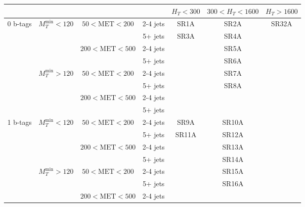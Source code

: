\documentclass[plain,landscape]{article}
\begin{document}
\begin{table}
\renewcommand{\arraystretch}{1.3}
\centering
\begin{tabular}{|c|c|c|c|c|c|c|c|}
\hline
& & \multicolumn{2}{|c|}{ } & $H_T < 300$ & \multicolumn{2}{|c|}{$300 < H_T < 1600$} & $H_T > 1600$  \\
\hline
\multirow{8}{*}{0 b-tags} &  \multirow{4}{*}{$M_T^{\textrm{min}} < 120$} & \multirow{2}{*}{ $50 < \textrm{MET} < 200$} & 2-4 jets & SR1A & \multicolumn{2}{|c|}{SR2A} & \multirow{30}{*}{SR32A}\\
\cline{4-7}
& & & 5+ jets & \multirow{7}{*}{SR3A} & \multicolumn{2}{|c|}{SR4A} & \\
\cline{3-4} \cline{6-7}
& &  \multirow{2}{*}{$200 < \textrm{MET} < 500$} &  2-4 jets & &  \multicolumn{2}{|c|}{SR5A} & \\
\cline{4-4} \cline{6-7}
& & & 5+ jets & & \multicolumn{2}{|c|}{SR6A} &  \\
\cline{2-4} \cline{6-7}
& \multirow{4}{*}{$M_T^{\textrm{min}} > 120$} & \multirow{2}{*}{ $50 < \textrm{MET} < 200$} & 2-4 jets & & \multicolumn{2}{|c|}{SR7A} & \\
\cline{4-4} \cline{6-7}
& & & 5+ jets & & \multicolumn{2}{|c|}{\multirow{3}{*}{SR8A}} & \\
\cline{3-4}
& &  \multirow{2}{*}{$200 < \textrm{MET} < 500$} &  2-4 jets & & \multicolumn{2}{|c|}{} & \\
\cline{4-4} 
& & & 5+ jets & & \multicolumn{2}{|c|}{} &  \\
\cline{1-7}
\multirow{8}{*}{1 b-tags} & \multirow{4}{*}{$M_T^{\textrm{min}} < 120$} & \multirow{2}{*}{ $50 < \textrm{MET} < 200$} & 2-4 jets & SR9A & \multicolumn{2}{|c|}{SR10A} & \\
\cline{4-7}
& & & 5+ jets & \multirow{7}{*}{SR11A} & \multicolumn{2}{|c|}{SR12A} & \\
\cline{3-4} \cline{6-7}
& & \multirow{2}{*}{ $200 < \textrm{MET} < 500$} &  2-4 jets & &  \multicolumn{2}{|c|}{SR13A} & \\
\cline{4-4} \cline{6-7}
& & & 5+ jets & & \multicolumn{2}{|c|}{SR14A} & \\
\cline{2-4} \cline{6-7}
 & \multirow{4}{*}{$M_T^{\textrm{min}} > 120$} & \multirow{2}{*}{ $50 < \textrm{MET} < 200$} & 2-4 jets & & \multicolumn{2}{|c|}{SR15A} & \\
\cline{4-4} \cline{6-7}
& & & 5+ jets &  & \multicolumn{2}{|c|}{\multirow{3}{*}{SR16A}} & \\
\cline{3-4}
& & \multirow{2}{*}{ $200 < \textrm{MET} < 500$} &  2-4 jets & &  \multicolumn{2}{|c|}{} & \\

\end{tabular}
\end{table}
\end{document}
